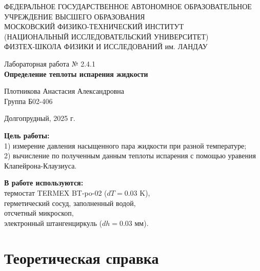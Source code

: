 \documentclass[a4paper,12pt]{article} %
\begin{document}
\begin{center}
	\footnotesize{ФЕДЕРАЛЬНОЕ ГОСУДАРСТВЕННОЕ АВТОНОМНОЕ ОБРАЗОВАТЕЛЬНОЕ 			УЧРЕЖДЕНИЕ ВЫСШЕГО ОБРАЗОВАНИЯ}\\
	\footnotesize{МОСКОВСКИЙ ФИЗИКО-ТЕХНИЧЕСКИЙ ИНСТИТУТ\\(НАЦИОНАЛЬНЫЙ 			ИССЛЕДОВАТЕЛЬСКИЙ УНИВЕРСИТЕТ)}\\
	\footnotesize{ФИЗТЕХ-ШКОЛА ФИЗИКИ И ИССЛЕДОВАНИЙ им. ЛАНДАУ\\}
	\hfill \break
	\hfill \break
	\hfill \break
	\hfill \break
\end{center}

\begin{center}   
    \hfill \break
	\hfill \break
	\hfill \break
	\hfill \break    \hfill \break
	\hfill \break
	\hfill \break
	\hfill \break
    \hfill \break
    \hfill \break
	\hfill \break
	\large{Лабораторная работа № 2.4.1\\\textbf{Определение теплоты испарения жидкости}}\\
	\begin{flushright}
		Плотникова Анастасия Александровна\\
		Группа Б02-406
	\end{flushright}
	\hfill \break
	\hfill \break
	\hfill \break
\end{center}
\hfill \break
\hfill \break
\hfill \break
\hfill \break
\hfill \break
\hfill \break
\hfill \break
\hfill \break
\hfill \break
\hfill \break
\hfill \break
\hfill \break
\hfill \break
\begin{center}
	Долгопрудный, 2025 г.
\end{center}
\thispagestyle{empty}
\newpage
	\textbf{Цель работы:}\\ 
  1) измерение давления насыщенного пара жидкости при разной температуре;\\ 
  2) вычисление по полученным данным теплоты испарения с помощью уравения Клапейрона-Клаузиуса.
	\hfill \break
	
	\textbf{В работе используются:}\\ 
  термостат TERMEX BT-po-02 ($dT = 0.03$ K),\\ 
  герметический сосуд, заполненный водой,\\ 
  отсчетный микроскоп,\\
  электронный штангенциркуль ($dh = 0.03$ мм).
	
\section*{Теоретическая справка}
\end{document}
